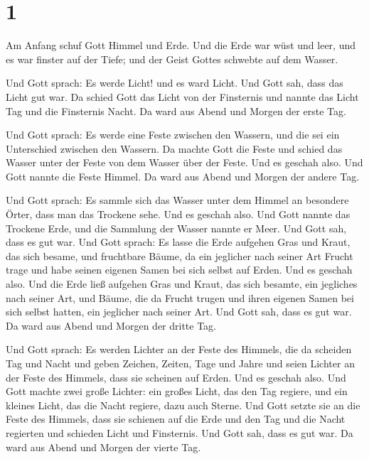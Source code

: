 \hypertarget{section}{%
\section{1}\label{section}}

 Am Anfang schuf Gott Himmel und Erde.  Und die
Erde war wüst und leer, und es war finster auf der Tiefe; und der Geist
Gottes schwebte auf dem Wasser.

 Und Gott sprach: Es werde Licht! und es ward Licht.
 Und Gott sah, dass das Licht gut war. Da schied Gott das
Licht von der Finsternis  und nannte das Licht Tag und die
Finsternis Nacht. Da ward aus Abend und Morgen der erste Tag.

 Und Gott sprach: Es werde eine Feste zwischen den Wassern,
und die sei ein Unterschied zwischen den Wassern.  Da machte
Gott die Feste und schied das Wasser unter der Feste von dem Wasser über
der Feste. Und es geschah also.  Und Gott nannte die Feste
Himmel. Da ward aus Abend und Morgen der andere Tag.

 Und Gott sprach: Es sammle sich das Wasser unter dem Himmel
an besondere Örter, dass man das Trockene sehe. Und es geschah also.
 Und Gott nannte das Trockene Erde, und die Sammlung der
Wasser nannte er Meer. Und Gott sah, dass es gut war.  Und
Gott sprach: Es lasse die Erde aufgehen Gras und Kraut, das sich besame,
und fruchtbare Bäume, da ein jeglicher nach seiner Art Frucht trage und
habe seinen eigenen Samen bei sich selbst auf Erden. Und es geschah
also.  Und die Erde ließ aufgehen Gras und Kraut, das sich
besamte, ein jegliches nach seiner Art, und Bäume, die da Frucht trugen
und ihren eigenen Samen bei sich selbst hatten, ein jeglicher nach
seiner Art. Und Gott sah, dass es gut war.  Da ward aus
Abend und Morgen der dritte Tag.

 Und Gott sprach: Es werden Lichter an der Feste des
Himmels, die da scheiden Tag und Nacht und geben Zeichen, Zeiten, Tage
und Jahre  und seien Lichter an der Feste des Himmels, dass
sie scheinen auf Erden. Und es geschah also.  Und Gott
machte zwei große Lichter: ein großes Licht, das den Tag regiere, und
ein kleines Licht, das die Nacht regiere, dazu auch Sterne.
 Und Gott setzte sie an die Feste des Himmels, dass sie
schienen auf die Erde  und den Tag und die Nacht regierten
und schieden Licht und Finsternis. Und Gott sah, dass es gut war.
 Da ward aus Abend und Morgen der vierte Tag.

